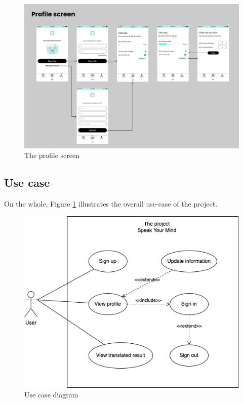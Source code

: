 \begin{figure}[H]
	\centering
	\includegraphics[width=\textwidth]{img/Chap5/Profile_screen.png}
	\caption{The profile screen}
\end{figure}





\newpage
\subsection{Use case}

On the whole, Figure \ref{fig:Chap4-usecase} illustrates the overall use-case of the project.

\begin{figure}[H]
	\centering
	\includegraphics[width=\textwidth]{img/Chap4/use-case.drawio.png}
	\caption{Use case diagram}
  \label{fig:Chap4-usecase}
\end{figure}

